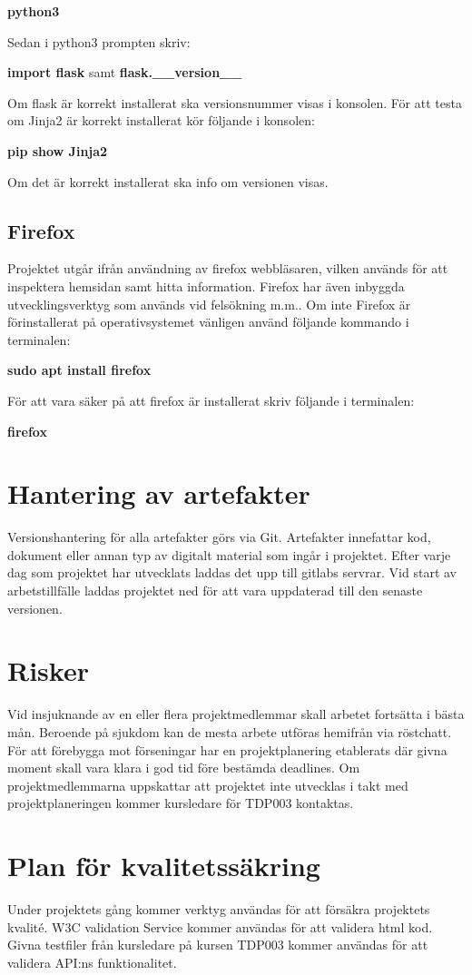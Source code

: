 \documentclass{TDP003mall}
\begin{document}
\textbf{python3}

Sedan i python3 prompten skriv:

\textbf{import flask} samt \textbf{flask.\_\_version\_\_}

Om flask är korrekt installerat ska versionsnummer visas i konsolen.
För att testa om Jinja2 är korrekt installerat kör följande i konsolen:

\textbf{pip show Jinja2}

Om det är korrekt installerat ska info om versionen visas.


\subsection{Firefox}
Projektet utgår ifrån användning av firefox webbläsaren, vilken används för att inspektera hemsidan samt hitta information. Firefox har även inbyggda utvecklingsverktyg som används vid felsökning m.m.. Om inte Firefox är förinstallerat på operativsystemet vänligen använd följande kommando i terminalen:

\textbf{sudo apt install firefox}

För att vara säker på att firefox är installerat skriv följande i terminalen:

\textbf{firefox}

\section{Hantering av artefakter}
Versionshantering för alla artefakter görs via Git. Artefakter innefattar kod, dokument eller annan typ av digitalt material som ingår i projektet. Efter varje dag som projektet har utvecklats laddas det upp till gitlabs servrar. Vid start av arbetstillfälle laddas projektet ned för att vara uppdaterad till den senaste versionen.

\section{Risker}
Vid insjuknande av en eller flera projektmedlemmar skall arbetet fortsätta i bästa mån. Beroende på sjukdom kan de mesta arbete utföras hemifrån via röstchatt. För att förebygga mot förseningar har en projektplanering etablerats där givna moment skall vara klara i god tid före bestämda deadlines. Om projektmedlemmarna uppskattar att projektet inte utvecklas i takt med projektplaneringen kommer kursledare för TDP003 kontaktas.  

\section{Plan för kvalitetssäkring}
Under projektets gång kommer verktyg användas för att försäkra projektets kvalité. W3C validation Service kommer användas för att validera html kod. Givna testfiler från kursledare på kursen TDP003 kommer användas för att validera API:ns funktionalitet.
\end{document}
